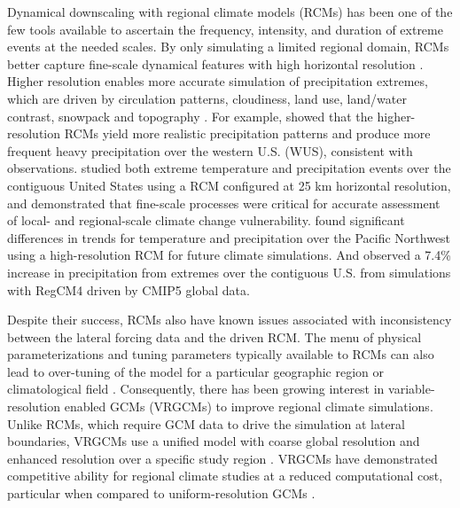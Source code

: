 \documentclass{ametsoc}
\begin{document}
Dynamical downscaling with regional climate models (RCMs) has been one of the few tools available to ascertain the frequency, intensity, and duration of extreme events at the needed scales.  By only simulating a limited regional domain, RCMs better capture fine-scale dynamical features with high horizontal resolution \citep{bell2004regional, frei2006future, rauscher2010resolution, wehner2013very}. Higher resolution enables more accurate simulation of precipitation extremes, which are driven by circulation patterns, cloudiness, land use, land/water contrast, snowpack and topography \citep{leung2003regional, diffenbaugh2005fine, salathe2008high, wehner2010effect}. For example, \cite{leung2003hydroclimate} showed that the higher-resolution RCMs yield more realistic precipitation patterns and produce more frequent heavy precipitation over the western U.S. (WUS), consistent with observations. \cite{diffenbaugh2005fine} studied both extreme temperature and precipitation events over the contiguous United States using a RCM configured at 25 km horizontal resolution, and demonstrated that fine-scale processes were critical for accurate assessment of local- and regional-scale climate change vulnerability. \cite{salathe2008high} found significant differences in trends for temperature and precipitation over the Pacific Northwest using a high-resolution RCM for future climate simulations.  And \cite{ashfaq2016high} observed a 7.4\% increase in precipitation from extremes over the contiguous U.S. from simulations with RegCM4 driven by CMIP5 global data.


Despite their success, RCMs also have known issues associated with inconsistency between the lateral forcing data and the driven RCM.  The menu of physical parameterizations and tuning parameters typically available to RCMs can also lead to over-tuning of the model for a particular geographic region or climatological field \citep{mcdonald2003transparent, laprise2008challenging, mesinger2013limited}.  Consequently, there has been growing interest in variable-resolution enabled GCMs (VRGCMs) to improve regional climate simulations. Unlike RCMs, which require GCM data to drive the simulation at lateral boundaries, VRGCMs use a unified model with coarse global resolution and enhanced resolution over a specific study region \citep{staniforth1978variable, fox1997finite}. VRGCMs have demonstrated competitive ability for regional climate studies at a reduced computational cost, particular when compared to uniform-resolution GCMs \citep{fox2006variable, rauscher2013exploring}.
\end{document}
